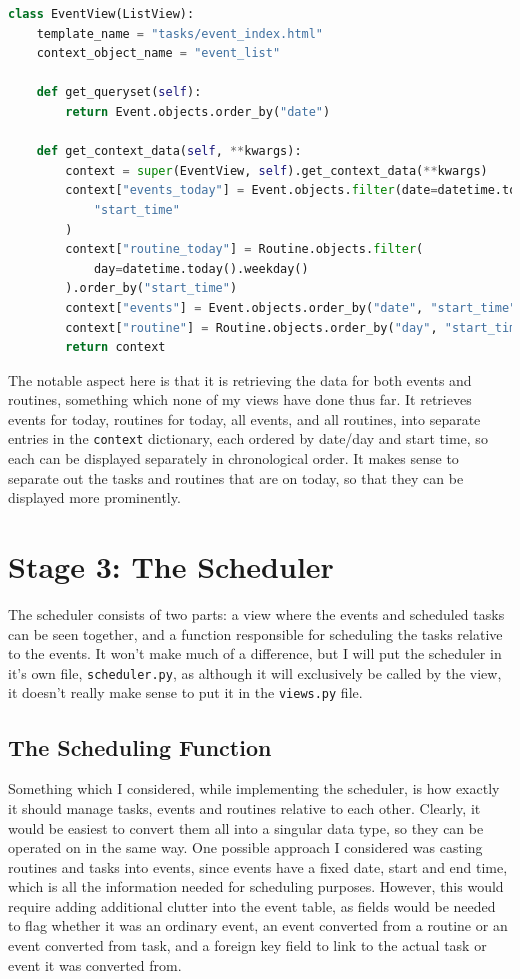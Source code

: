 \documentclass{article}
\begin{document}
\begin{lstlisting}[language=Python, breaklines]
class EventView(ListView):
    template_name = "tasks/event_index.html"
    context_object_name = "event_list"

    def get_queryset(self):
        return Event.objects.order_by("date")

    def get_context_data(self, **kwargs):
        context = super(EventView, self).get_context_data(**kwargs)
        context["events_today"] = Event.objects.filter(date=datetime.today()).order_by(
            "start_time"
        )
        context["routine_today"] = Routine.objects.filter(
            day=datetime.today().weekday()
        ).order_by("start_time")
        context["events"] = Event.objects.order_by("date", "start_time")
        context["routine"] = Routine.objects.order_by("day", "start_time")
        return context
\end{lstlisting}

The notable aspect here is that it is retrieving the data for both events and routines,
something which none of my views have done thus far.
It retrieves events for today,
routines for today,
all events,
and all routines,
into separate entries in the \texttt{context} dictionary,
each ordered by date/day and start time,
so each can be displayed separately in chronological order.
It makes sense to separate out the tasks and routines that are on today,
so that they can be displayed more prominently.

\section{Stage 3: The Scheduler}
The scheduler consists of two parts:
a view where the events and scheduled tasks can be seen together,
and a function responsible for scheduling the tasks relative to the events.
It won't make much of a difference,
but I will put the scheduler in it's own file,
\texttt{scheduler.py},
as although it will exclusively be called by the view,
it doesn't really make sense to put it in the \texttt{views.py} file.

\subsection{The Scheduling Function}
Something which I considered,
while implementing the scheduler,
is how exactly it should manage tasks, events and routines relative to each other.
Clearly, it would be easiest to convert them all into a singular data type,
so they can be operated on in the same way.
One possible approach I considered was casting routines and tasks into events,
since events have a fixed date, start and end time,
which is all the information needed for scheduling purposes.
However, this would require adding additional clutter into the event table,
as fields would be needed to flag whether it was an ordinary event,
an event converted from a routine or an event converted from task,
and a foreign key field to link to the actual task or event it was converted from.
\end{document}
